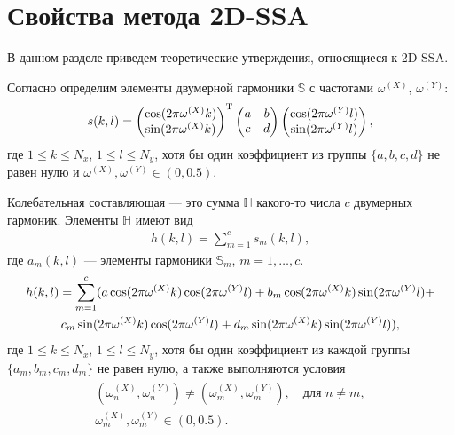 \documentclass[specialist,
               substylefile = spbu.rtx,
               subf,href,colorlinks=true, 12pt]{disser}
\begin{document}
\section{Свойства метода 2D-SSA}
\label{sec:2d_ssa_theory}
В данном разделе приведем теоретические утверждения, относящиеся к 2D-SSA.

Согласно \cite{Golyandina.Usevich2010} определим элементы двумерной гармоники $\mathbb{S}$ с частотами $\omega^{(X)}$, $\omega^{(Y)}$:
\begin{gather} \label{eq:2d_cos_el}
\notag
s(k,l) =  \left(
\begin{matrix}
\cos(2\pi \omega^{(X)}k) \\ \notag
\sin(2\pi \omega^{(X)}k)
\end{matrix}
\right)^{\mathrm{T}}
 \left(
\begin{matrix}
a & b \\
c & d
\end{matrix}
\right)
 \left(
\begin{matrix}
\cos(2\pi \omega^{(Y)}l) \\ \notag
\sin(2\pi \omega^{(Y)}l)
\end{matrix}
\right),
\notag
\end{gather}
где $1 \leqslant k \leqslant N_x$, $1 \leqslant l \leqslant N_y$, хотя бы один коэффициент из  группы $\{a,b,c,d\}$ не равен нулю и
$\omega^{(X)}, \omega^{(Y)} \in (0,0.5)$.

Колебательная составляющая --- это сумма $\mathbb{H}$ какого-то числа $c$ двумерных гармоник. Элементы $\mathbb{H}$ имеют вид
\begin{gather} \label{eq:2d_cos}
h(k,l) = \sum_{m=1}^{c}{s_m(k,l)},
\end{gather}
где $a_m(k,l)$ --- элементы гармоники $\mathbb{S}_m$, $m=1,\ldots,c$.
\begin{gather} 
\notag
h(k,l) = \sum_{m=1}^{c}(a \cos(2\pi \omega^{(X)}k) \cos(2\pi \omega^{(Y)}l) +
b_m \cos(2\pi \omega^{(X)}k) \sin(2\pi \omega^{(Y)}l) + \\ \label{eq:2d_cos_el}
c_m \sin(2\pi \omega^{(X)}k) \cos(2\pi \omega^{(Y)}l) +
d_m \sin(2\pi \omega^{(X)}k) \sin(2\pi \omega^{(Y)}l)),
\end{gather}
где $1 \leqslant k \leqslant N_x$, $1 \leqslant l \leqslant N_y$, хотя бы один коэффициент из каждой группы $\{a_m,b_m,c_m,d_m\}$ не равен нулю, а также выполняются условия 
\begin{align} \label{eq:2d_omega}
\begin{matrix}
(\omega_n^{(X)}, \omega_n^{(Y)}) \not = (\omega_m^{(X)}, \omega_m^{(Y)}), \quad \text{для } n \not= m,\\
\omega_m^{(X)}, \omega_m^{(Y)} \in (0,0.5).
\end{matrix}
\end{align}
\end{document}
